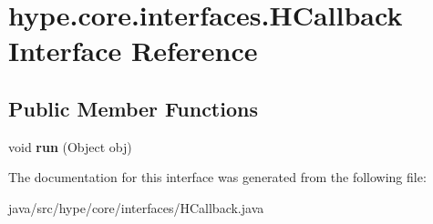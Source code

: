 \hypertarget{interfacehype_1_1core_1_1interfaces_1_1_h_callback}{\section{hype.\-core.\-interfaces.\-H\-Callback Interface Reference}
\label{interfacehype_1_1core_1_1interfaces_1_1_h_callback}
}
\subsection*{Public Member Functions}
\begin{DoxyCompactItemize}
\item 
\hypertarget{interfacehype_1_1core_1_1interfaces_1_1_h_callback_a8945fab047ec598b20202e687247ead4}{void {\bfseries run} (Object obj)}\label{interfacehype_1_1core_1_1interfaces_1_1_h_callback_a8945fab047ec598b20202e687247ead4}

\end{DoxyCompactItemize}


The documentation for this interface was generated from the following file\-:\begin{DoxyCompactItemize}
\item 
java/src/hype/core/interfaces/H\-Callback.\-java\end{DoxyCompactItemize}
